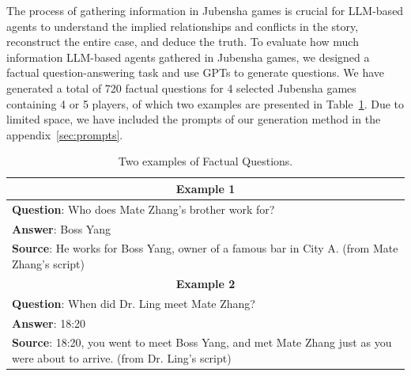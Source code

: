 \documentclass[11pt]{article}
\begin{document}
The process of gathering information in Jubensha games is crucial for LLM-based agents to understand the implied relationships and conflicts in the story, reconstruct the entire case, and deduce the truth. To evaluate how much information LLM-based agents gathered in Jubensha games, we designed a factual question-answering task and use GPTs to generate questions. We have generated a total of 720 factual questions for 4 selected Jubensha games containing 4 or 5 players, of which two examples are presented in Table~\ref{table:factual_ques}. Due to limited space, we have included the prompts of our generation method in the appendix~\ref{sec:prompts}.




\begin{table}[t]
\centering
\begin{tabularx}{0.45\textwidth}{|X|}
\hline
\multicolumn{1}{|c|}{\textbf{Example 1}} \\ \hline
\textbf{Question}: Who does Mate Zhang's brother work for? \\ 
\textbf{Answer}: Boss Yang \\ 
\textbf{Source}: He works for Boss Yang, owner of a famous bar in City A. (from Mate Zhang's script) \vspace{0pt}\\ \hline
\multicolumn{1}{|c|}{\textbf{Example 2}} \\ \hline
\textbf{Question}:  When did Dr. Ling meet Mate Zhang? \\ 
\textbf{Answer}: 18:20 \\ 
\textbf{Source}: 18:20, you went to meet Boss Yang, and met Mate Zhang just as you were about to arrive.  (from Dr. Ling's script) \vspace{0pt}\\ \hline
\end{tabularx}
\vspace{-2mm}
\caption{Two examples of Factual Questions.}
\vspace{-1mm}
\label{table:factual_ques}
\end{table}
\end{document}
